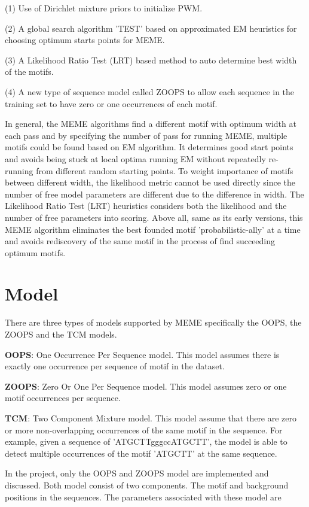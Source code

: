 \documentclass{article}
\begin{document}
(1) Use of Dirichlet mixture priors to initialize PWM.

(2) A global search algorithm 'TEST' based on approximated EM heuristics for choosing optimum starts points for MEME. 

(3) A Likelihood Ratio Test (LRT) based method to auto determine best width of the motifs. 

(4) A new type of sequence model called ZOOPS to allow each sequence in the training set to have zero or one occurrences of each motif. 

In general, the MEME algorithms find a different motif with optimum width at each pass and by specifying the number of pass for running MEME, multiple motifs could be found based on EM algorithm. It determines good start points and avoids being stuck at local optima running EM without repeatedly re-running from different random starting points. To weight importance of motifs between different width, the likelihood metric cannot be used directly since the number of free model parameters are different due to the difference in width. The Likelihood Ratio Test (LRT) heuristics considers both the likelihood and the number of free parameters into scoring. Above all, same as its early versions, this MEME algorithm eliminates the best founded motif 'probabilistic-ally' at a time and avoids rediscovery of the same motif in the process of find succeeding optimum motifs.  


\section{Model}
There are three types of models supported by MEME specifically the OOPS, the ZOOPS and the TCM models.

\textbf{OOPS}: One Occurrence Per Sequence model. This model assumes there is exactly one occurrence per sequence of motif in the dataset.

\textbf{ZOOPS}: Zero Or One Per Sequence model. This model assumes zero or one motif occurrences per sequence.

\textbf{TCM}: Two Component Mixture model. This model assume that there are zero or more non-overlapping occurrences of the same motif in the sequence. For example, given a sequence of 'ATGCTTgggccATGCTT', the model is able to detect multiple occurrences of the motif 'ATGCTT' at the same sequence. 

In the project, only the OOPS and ZOOPS model are implemented and discussed. Both model consist of two components. The motif and background positions in the sequences. The parameters associated with these model are 
\end{document}
